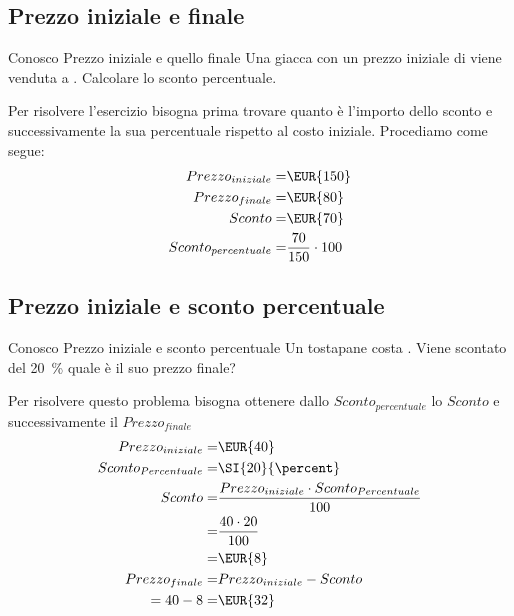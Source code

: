  \subsection{Prezzo iniziale e finale} 
 	\begin{esempiot}{Conosco Prezzo iniziale e quello finale}{}
 	Una giacca con un prezzo iniziale di  viene venduta a . Calcolare lo sconto percentuale. 
 \end{esempiot}
Per risolvere l'esercizio bisogna prima trovare quanto è l'importo dello sconto e successivamente  la sua percentuale rispetto al costo iniziale. Procediamo come segue:
 \begin{align*}
 	{Prezzo}_{iniziale}=&\mbox{\EUR{150}}\\
 	{Prezzo}_{finale}=&\mbox{\EUR{80}}\\
 	Sconto=&\mbox{\EUR{70}}\\
 	{Sconto}_{percentuale}=&\dfrac{70}{150}\cdot 100\\
 \end{align*}
\subsection{Prezzo iniziale e sconto percentuale}
	\begin{esempiot}{Conosco Prezzo iniziale e sconto percentuale}{}
Un tostapane costa . Viene scontato del \SI{20}{\percent} quale è il suo prezzo finale?
\end{esempiot}
Per risolvere questo problema bisogna ottenere dallo ${Sconto}_{percentuale}$  lo $Sconto$ e successivamente il ${Prezzo}_{finale}$
\begin{align*}
	{Prezzo}_{iniziale}=&\mbox{\EUR{40}}\\
 	{Sconto}_{Percentuale}=&\SI{20}{\percent}\\
 	Sconto=&\dfrac{{Prezzo}_{iniziale}\cdot {Sconto}_{Percentuale} }{100}\\
 	=&\dfrac{40\cdot 20 }{100}\\
 	=&\mbox{\EUR{8}}\\
 	{Prezzo}_{finale}=&{Prezzo}_{iniziale}-Sconto\\
 	=40-8=&\mbox{\EUR{32}}\\
\end{align*}

